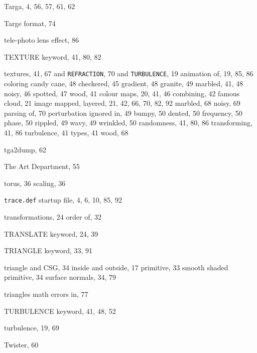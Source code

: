 \begin{theindex}
  \indexspace

  \item Targa, 4, 56, 57, 61, 62
  \item Targe format, 74
  \item tele-photo lens effect, 86
  \item {\ptt TEXTURE} keyword, 41, 80, 82
  \item textures, 41, 67
    \subitem and {\tt REFRACTION}, 70
    \subitem and {\tt TURBULENCE}, 19
    \subitem animation of, 19, 85, 86
    \subitem coloring
      \subsubitem candy cane, 48
      \subsubitem checkered, 45
      \subsubitem gradient, 48
      \subsubitem granite, 49
      \subsubitem marbled, 41, 48
      \subsubitem noisy, 46
      \subsubitem spotted, 47
      \subsubitem wood, 41
    \subitem colour maps, 20, 41, 46
    \subitem combining, 42
    \subitem famous cloud, 21
    \subitem image mapped, 
    \subitem layered, 21, 42, 66, 70, 82, 92
    \subitem marbled, 68
    \subitem noisy, 69
    \subitem parsing of, 70
    \subitem perturbation
       ignored in, 49
      \subsubitem bumpy, 50
      \subsubitem dented, 50
      \subsubitem frequency, 50
      \subsubitem phase, 50
      \subsubitem rippled, 49
      \subsubitem wavy, 49
      \subsubitem wrinkled, 50
    \subitem randomness, 41, 80, 86
    \subitem transforming, 41, 86
    \subitem turbulence, 41
    \subitem types, 41
    \subitem wood, 68
  \item {\ptt tga2dump}, 62
  \item {\pem {}The Art Department}, 55
  \item torus, 36
    \subitem scaling, 36
  \item {\tt trace.def} startup file, 4, 6, 10, 85, 92
  \item transformations, 24
    \subitem order of, 32
  \item {\ptt TRANSLATE} keyword, 24, 39
  \item {\ptt TRIANGLE} keyword, 33, 91
  \item triangle
    \subitem and CSG, 34
    \subitem inside and outside, 17
    \subitem primitive, 33
    \subitem smooth shaded primitive, 34
    \subitem surface normals, 34, 79
  \item triangles
    \subitem math errors in, 77
  \item {\ptt TURBULENCE} keyword, 41, 48, 52
  \item turbulence, 19, 69
  \item {\ptt Twister}, 60


\end{theindex}
